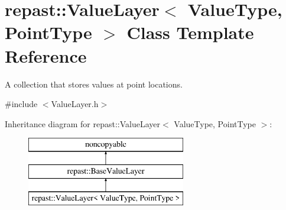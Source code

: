\hypertarget{classrepast_1_1_value_layer}{\section{repast\-:\-:Value\-Layer$<$ Value\-Type, Point\-Type $>$ Class Template Reference}
\label{classrepast_1_1_value_layer}
}


A collection that stores values at point locations.  




{\ttfamily \#include $<$Value\-Layer.\-h$>$}

Inheritance diagram for repast\-:\-:Value\-Layer$<$ Value\-Type, Point\-Type $>$\-:\begin{figure}[H]
\begin{center}
\leavevmode
\includegraphics[height=3.000000cm]{classrepast_1_1_value_layer}
\end{center}
\end{figure}
